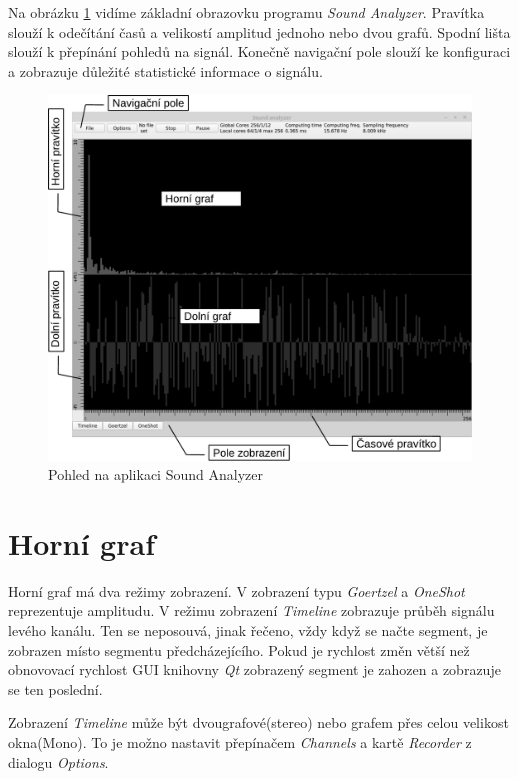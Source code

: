 Na obrázku \ref{obr:manual1} vidíme základní obrazovku programu \emph{Sound Analyzer}.
Pravítka slouží k odečítání časů a velikostí amplitud jednoho nebo dvou grafů. Spodní lišta slouží k přepínání pohledů na signál. Konečně navigační pole slouží ke konfiguraci a zobrazuje důležité statistické informace o signálu. 

\begin{figure}
  \begin{center}
    \includegraphics[scale=.65]{obr/manual1}
  \end{center}
  \caption{Pohled na aplikaci Sound Analyzer}
  \label{obr:manual1}
\end{figure}

\section{Horní graf}
\label{sec:topgraph}

Horní graf má dva režimy zobrazení. V zobrazení typu \emph{Goertzel} a \emph{OneShot} reprezentuje amplitudu. V režimu zobrazení \emph{Timeline} zobrazuje průběh signálu levého kanálu.
Ten se neposouvá, jinak řečeno, vždy když se načte segment, je zobrazen místo segmentu předcházejícího. Pokud je rychlost změn větší než obnovovací rychlost GUI knihovny \emph{Qt} zobrazený segment je zahozen a zobrazuje se ten poslední.

Zobrazení \emph{Timeline} může být dvougrafové(stereo) nebo grafem přes celou velikost okna(Mono). To je možno nastavit přepínačem \emph{Channels} a kartě \emph{Recorder} z dialogu \emph{Options}.


